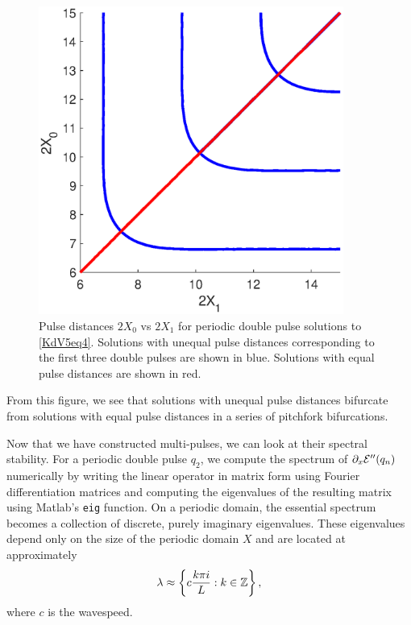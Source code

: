 \documentclass[11pt,reqno]{amsart}
\theoremstyle{plain}
\theoremstyle{definition}
\theoremstyle{remark}
\begin{document}
\begin{figure}
\begin{center}
\includegraphics[width=10cm]{images/periodicpitchfork.eps}
\end{center}
\caption[Pulse distances of periodic multi-pulses in KdV5]{Pulse distances $2 X_0$ vs $2 X_1$ for periodic double pulse solutions to \cref{KdV5eq4}. Solutions with unequal pulse distances corresponding to the first three double pulses are shown in blue. Solutions with equal pulse distances are shown in red.}
\label{fig:periodicpitchfork}
\end{figure}
From this figure, we see that solutions with unequal pulse distances bifurcate from solutions with equal pulse distances in a series of pitchfork bifurcations. 

Now that we have constructed multi-pulses, we can look at their spectral stability. For a periodic double pulse $q_2$, we compute the spectrum of $\partial_x \mathcal{E}''(q_n)$ numerically by writing the linear operator in matrix form using Fourier differentiation matrices and computing the eigenvalues of the resulting matrix using Matlab's \texttt{eig} function. On a periodic domain, the essential spectrum becomes a collection of discrete, purely imaginary eigenvalues. These eigenvalues depend only on the size of the periodic domain $X$ and are located at approximately
\begin{equation}\label{Kdv5peress}
\lambda \approx \left\{ c \frac{k \pi i}{L} : k \in \mathbb{Z} \right\} ,
\end{equation}
where $c$ is the wavespeed.
\end{document}
